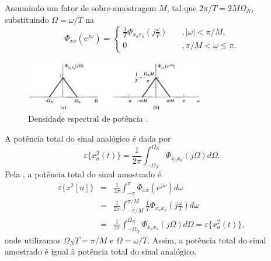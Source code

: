 \begin{frame}[allowframebreaks]
  \framebreak

  Assumindo um fator de sobre-amostragem $M$, tal que $2\pi/T = 2M\Omega_N$, substituindo $\Omega = \omega/T$ na 
  \begin{equation}
  \label{eq-Phixxiw}
  \Phi_{xx} (e^{j\omega}) = \begin{cases} \frac{1}{T} \Phi_{x_a x_a} \left( j \frac{\omega}{T} \right)   \quad & , |\omega| < \pi/M,  \\ 
  0 & , \pi/M < \omega \le \pi .\end{cases}
  \end{equation}
  
  \begin{figure}[h!]
  \centering
  \includegraphics[width=0.7\textwidth]{images/oppenheim_fig458.png}
  \caption{Densidade espectral de potência \citep{oppenheim2009}.}
  \label{fig:oppenheim_fig458}
  \end{figure}

  \framebreak

  A potência total do sinal analógico é dada por
  \begin{equation}
  \varepsilon\{x_a^2(t)\} = \frac{1}{2\pi} \int_{-\Omega_N}^{\Omega_N} \Phi_{x_a x_a} (j \Omega) d\Omega .
  \end{equation}
  Pela , a potência total do sinal amostrado é
  \begin{eqnarray}
  \varepsilon\{x^2[n]\} &=& \frac{1}{2\pi} \int_{-\pi}^{\pi} \Phi_{xx}(e^{j\omega}) d\omega \nonumber \\
                        &=& \frac{1}{2\pi} \int_{-\pi/M}^{\pi/M} \frac{1}{T} \Phi_{x_a x_a} \left( j \frac{\omega}{T} \right) d\omega \nonumber \\
                        &=& \frac{1}{2\pi} \int_{-\Omega_N}^{\Omega_N} \Phi_{x_a x_a} (j\Omega) d\Omega = \varepsilon\{x_a^2(t)\} ,
  \end{eqnarray}
  onde utilizamos $\Omega_N T = \pi/M$ e $\Omega = \omega/T$.
  Assim, a potência total do sinal amostrado é igual à potência total do sinal analógico.

  \framebreak
 

\end{frame}
